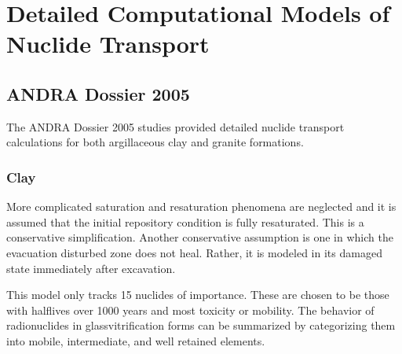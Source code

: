 \section{Detailed Computational Models of Nuclide Transport}
\label{sec:detailed_nuclide}

\subsection{ANDRA Dossier 2005} The ANDRA Dossier 2005 studies provided
detailed nuclide transport calculations for both argillaceous clay and granite
formations.

\subsubsection{Clay} More complicated saturation and resaturation phenomena are
neglected and it is assumed that the initial repository condition is fully
resaturated. This is a conservative simplification. Another conservative
assumption is one in which the evacuation disturbed zone does not heal. Rather,
it is modeled in its damaged state immediately after excavation. 

This model only tracks 15 nuclides of importance.  These are chosen to be those
with halflives over 1000 years and most toxicity or mobility.
\cite{andra_argile:_2005} %
The behavior of radionuclides in glassvitrification forms can be summarized by categorizing them into mobile,
intermediate, and well retained elements. 








